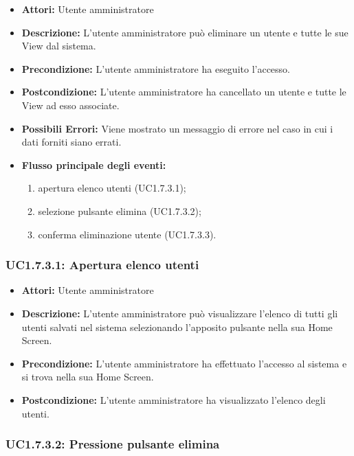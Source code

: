 \begin{itemize}
    \item \textbf{Attori:} Utente amministratore
    \item \textbf{Descrizione:} L'utente amministratore può eliminare un utente e tutte le sue View dal sistema.
    \item \textbf{Precondizione:} L'utente amministratore ha eseguito l'accesso.
    \item \textbf{Postcondizione:} L'utente amministratore ha cancellato un utente e tutte le View ad esso associate.
	\item \textbf{Possibili Errori:}
    Viene mostrato un messaggio di errore nel caso in cui i dati forniti siano errati.
    \item \textbf{Flusso principale degli eventi:}

    \begin{enumerate}
        \item apertura elenco utenti (UC1.7.3.1);
        \item selezione pulsante elimina (UC1.7.3.2);
        \item conferma eliminazione utente (UC1.7.3.3).
    \end{enumerate}

\end{itemize}

\subsubsection{UC1.7.3.1: Apertura elenco utenti}

\begin{itemize}
    \item \textbf{Attori:} Utente amministratore
    \item \textbf{Descrizione:} L'utente amministratore può visualizzare l'elenco di tutti gli utenti salvati nel sistema selezionando l'apposito pulsante nella sua Home Screen.
    \item \textbf{Precondizione:} L'utente amministratore ha effettuato l'accesso al sistema e si trova nella sua Home Screen.
    \item \textbf{Postcondizione:} L'utente amministratore ha visualizzato l'elenco degli utenti.
\end{itemize}

\subsubsection{UC1.7.3.2: Pressione pulsante elimina}

